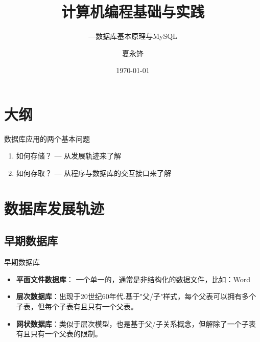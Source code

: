 \documentclass[CJK]{beamer}
\begin{document}
\begin{CJK*}{UTF8}{gbsn}

\title{计算机编程基础与实践}
\subtitle{---数据库基本原理与MySQL}
\author{夏永锋}

\date{\today}

\begin{frame}
	\titlepage
\end{frame}

\section*{大纲}
\begin{frame}
    \tableofcontents
\end{frame}

\begin{frame}{数据库应用的两个基本问题}
	\begin{enumerate}
		\item 如何存储？  --- 从发展轨迹来了解
		\item 如何存取？  --- 从程序与数据库的交互接口来了解
	\end{enumerate}
\end{frame}

\section{数据库发展轨迹}
\subsection{早期数据库}
\begin{frame}{早期数据库}
	\begin{block}{}
		\begin{itemize}
		\item {\bf 平面文件数据库}： 一个单一的，通常是非结构化的数据文件，比如：Word
		\item {\bf 层次数据库}：出现于20世纪60年代.基于"父/子"样式，每个父表可以拥有多个子表，但每个子表有且只有一个父表。
		\item {\bf 网状数据库}：类似于层次模型，也是基于父/子关系概念，但解除了一个子表有且只有一个父表的限制。
		\end{itemize}
	\end{block}
\end{frame}


\end{CJK*}
\end{document}

